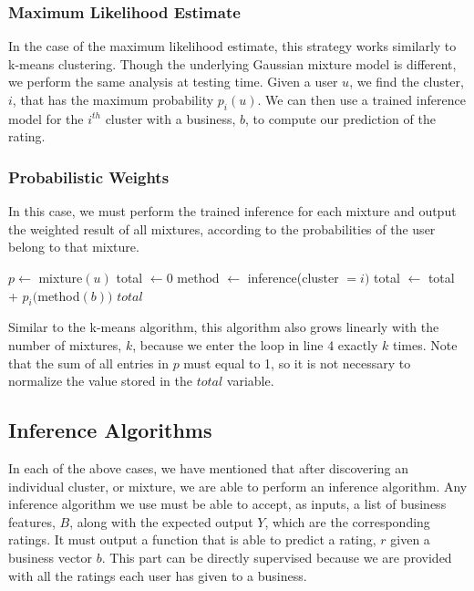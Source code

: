 \documentclass[11pt]{article}
\begin{document}
\subsubsection{Maximum Likelihood Estimate}
In the case of the maximum likelihood estimate, this strategy works similarly to k-means clustering. Though the underlying Gaussian mixture model is different, we perform the same analysis at testing time. Given a user $u$, we find the cluster, $i$, that has the maximum probability $p_i(u)$. We can then use a trained inference model for the $i^{th}$ cluster with a business, $b$, to compute our prediction of the rating.

\subsubsection{Probabilistic Weights}
In this case, we must perform the trained inference for each mixture and output the weighted result of all mixtures, according to the probabilities of the user belong to that mixture.\\

\begin{algorithmic}[1]
	\State $p \gets$ mixture$(u)$ 
	\State total $\gets 0$
	 
	\State method $\gets$ inference(cluster $=i)$ 
	\State total $\gets$ total + $p_i($method$(b))$
	\EndFor
	\State \Return $total$
	\EndFunction
\end{algorithmic}
\medskip

Similar to the k-means algorithm, this algorithm also grows linearly with the number of mixtures, $k$, because we enter the loop in line 4 exactly $k$ times. Note that the sum of all entries in $p$ must equal to 1, so it is not necessary to normalize the value stored in the $total$ variable.

\subsection{Inference Algorithms}
In each of the above cases, we have mentioned that after discovering an individual cluster, or mixture, we are able to perform an inference algorithm. Any inference algorithm we use must be able to accept, as inputs, a list of business features, $B$, along with the expected output $Y$, which are the corresponding ratings. It must output a function that is able to predict a rating, $r$ given a business vector $b$. This part can be directly supervised because we are provided with all the ratings each user has given to a business.
\end{document}
